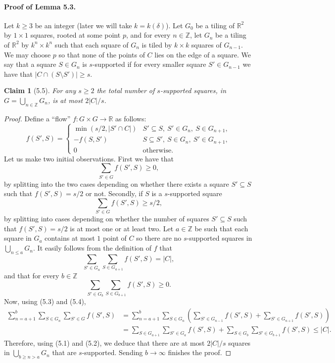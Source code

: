 \documentclass[UTF8,11pt]{ctexart}
\newtheorem*{claim}{Claim}
\theoremstyle{definition}
\newcommand{\R}{\mathbb R}
\newcommand{\Z}{\mathbb Z}
\begin{document}
\paragraph{Proof of Lemma 5.3.}
Let $k\ge3$ be an integer (later we will take $k=k(\delta)$). Let $G_0$ be a tiling of $\R^2$ by $1\times1$ squares, rooted at some point $p$, and for every $n\in\Z$, let $G_n$ be a tiling of $\R^2$ by $k^n\times k^n$ such that each square of $G_n$ is tiled by $k\times k$ squares of $G_{n-1}$. We may choose $p$ so that none of the points of $C$ lies on the edge of a square.
We say that a square $S\in G_n$ is $s$-supported if for every smaller square $S'\in G_{n-1}$ we have that $|C\cap(S\setminus S')|\ge s$.
\begin{claim}[5.5]
For any $s\ge2$ the total number of $s$-supported squares, in $G=\bigcup_{n\in\Z}G_n$, is at most $2|C|/s$.
\end{claim}
\begin{proof}
Define a ``flow'' $f:G\times G\to\R$ as follows:
\[
f(S',S)=\begin{cases}
\min(s/2,|S'\cap C|)&S'\subseteq S,\ S'\in G_n,\ S\in G_{n+1},\\
-f(S,S')&S\subseteq S',\ S\in G_n,\ S'\in G_{n+1},\\
0&\text{otherwise}.
\end{cases}
\]
Let us make two initial observations. First we have that
\[
\sum_{S'\in G}f(S',S)\ge0,\tag{5.1}
\]
by splitting into the two cases depending on whether there exists a square $S'\subseteq S$ such that $f(S',S)=s/2$ or not. Secondly, if $S$ is a $s$-supported square
\[
\sum_{S'\in G}f(S',S)\ge s/2,\tag{5.2}
\]
by splitting into cases depending on whether the number of squares $S'\subseteq S$ such that $f(S',S)=s/2$ is at most one or at least two.
Let $a\in\Z$ be such that each square in $G_a$ contains at most $1$ point of $C$ so there are no $s$-supported squares in $\bigcup_{n\le a}G_n$. It easily follows from the definition of $f$ that
\[
\sum_{S'\in G_a}\sum_{S\in G_{a+1}}f(S',S)=|C|,\tag{5.3}
\]
and that for every $b\in\Z$
\[
\sum_{S'\in G_b}\sum_{S\in G_{b+1}}f(S',S)\ge0.\tag{5.4}
\]
Now, using (5.3) and (5.4),
\begin{align*}
\sum_{n=a+1}^b\sum_{S\in G_n}\sum_{S'\in G}f(S',S)
&=\sum_{n=a+1}^b\sum_{S\in G_n}\left(\sum_{S'\in G_{n-1}}f(S',S)+\sum_{S'\in G_{n+1}}f(S',S)\right)\\
&=\sum_{S\in G_{a+1}}\sum_{S'\in G_a}f(S',S)
+\sum_{S\in G_b}\sum_{S'\in G_{b+1}}f(S',S)\le|C|.
\end{align*}
Therefore, using (5.1) and (5.2), we deduce that there are at most $2|C|/s$ squares in $\bigcup_{b\ge n>a}G_n$ that are $s$-supported. Sending $b\to\infty$ finishes the proof.
\end{proof}
\end{document}
